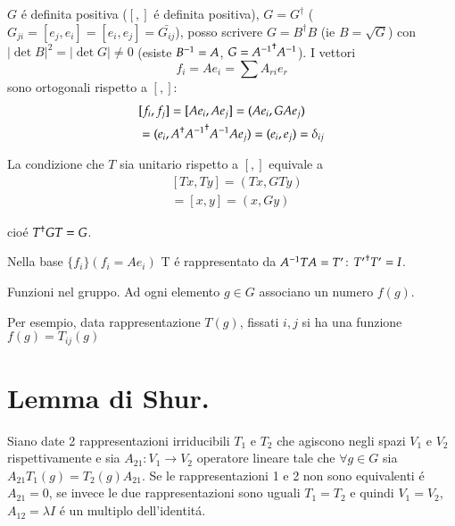 \documentclass[oneside,12pt]{memoir}
\begin{document}
$G$ \'e definita positiva ($[,]$ \'e definita positiva), $G=G^{\dag}$ ($G_{ji}=[e_j,e_i]=[e_i,e_j]=\bar{G_{ij}}$), posso scrivere $G=B^{\dag}B$ (ie $B=\sqrt{G}$) con $|\det{B}|^2=|\det{G}|\neq0$ (esiste ${{B}^{-1}}=A$, $G={{{{A}^{-1}}}^{\dag}}{{A}^{-1}}$). I vettori
\begin{equation*}
f_i=Ae_i=\sum A_{ri}e_r
\end{equation*}
sono ortogonali rispetto a $[,]$:
\begin{align*}
&[f_i,f_j]=[Ae_i,Ae_j]=(Ae_i,GAe_j)\\
&=(e_i,A^{\dag}{{{{A}^{-1}}}^{\dag}}{{A}^{-1}}Ae_j)=(e_i,e_j)=\delta_{ij}
\end{align*}

La condizione che $T$ sia unitario rispetto a $[,]$ equivale a
\begin{align*}
&[Tx,Ty]=(Tx,GTy)\\
&=[x,y]=(x,Gy)
\end{align*}

cio\'e ${{T}^{\dag}}GT=G$.

Nella base $\{f_i\} (f_i=Ae_i)$ T \'e rappresentato da ${{A}^{-1}}TA=T'$: ${{T'}^{\dag}}T'=I$.

\begin{definition}{Funzioni nel gruppo.}
Ad ogni elemento $g\in G$ associano un numero $f(g)$.

Per esempio, data rappresentazione $T(g)$, fissati $i,j$ si ha una funzione $f(g)=T_{ij}(g)$
\end{definition}

\section{Lemma di Shur.}

Siano date 2 rappresentazioni irriducibili $T_1$ e $T_2$ che agiscono negli spazi $V_1$ e $V_2$ rispettivamente e sia $A_{21}:V_1\to V_2$ operatore lineare tale che $\forall g\in G$ sia $A_{21}T_1(g)=T_2(g)A_{21}$. Se le rappresentazioni 1 e 2 non sono equivalenti \'e $A_{21}=0$, se invece le due rappresentazioni sono uguali $T_1=T_2$ e quindi $V_1=V_2$, $A_{12}=\lambda I$ \'e un multiplo dell'identit\'a.
\end{document}
